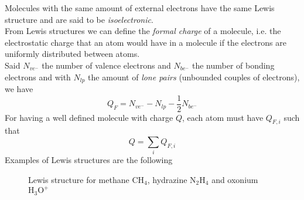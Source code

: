 \documentclass[../qm.tex]{subfiles}
\begin{document}
Molecules with the same amount of external electrons have the same Lewis structure and are said to be \emph{isoelectronic}.\\
From Lewis structures we can define the \emph{formal charge} of a molecule, i.e. the electrostatic charge that an atom would have in a molecule if the electrons are uniformly distributed between atoms.\\
Said $N_{ve^-}$ the number of valence electrons and $N_{be^-}$ the number of bonding electrons and with $N_{lp}$ the amount of \emph{lone pairs} (unbounded couples of electrons), we have 
\begin{equation}
	Q_F=N_{ve^-}-N_{lp}-\frac{1}{2}N_{be^-}
	\label{eq:formalcharge.chem}
\end{equation}
For having a well defined molecule with charge $Q$, each atom must have $Q_{F, i}$ such that
\begin{equation}
	Q=\sum_iQ_{F, i}
	\label{eq:charfprop.chem}
\end{equation}
Examples of Lewis structures are the following
\begin{figure}[H]
	\centering
	\qquad{}\qquad{}
	\caption{Lewis structure for methane $\mathrm{CH_4}$, hydrazine $\mathrm{N_2H_4}$ and oxonium $\mathrm{H_3O^+}$}
	\label{fig:lewis.chem}
\end{figure}
\end{document}
